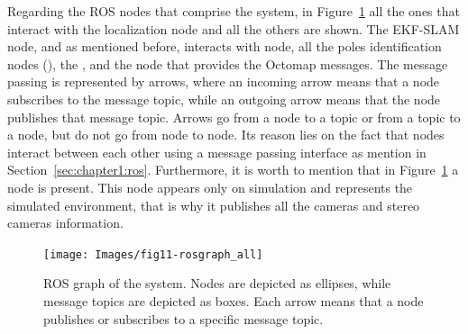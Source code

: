 Regarding the \ac{ROS} nodes that comprise the system, in Figure~\ref{fig:chapter2:architecture:nodes:all} all the ones that interact with the localization node and all the others are shown. The EKF-SLAM node, and as mentioned before, interacts with  node, all the poles identification nodes (), the , and the  node that provides the Octomap messages. The message passing is represented by arrows, where an incoming arrow means that a node subscribes to the message topic, while an outgoing arrow means that the node publishes that message topic. Arrows go from a node to a topic or from a topic to a node, but do not go from node to node. Its reason lies on the fact that nodes interact between each other using a message passing interface as mention in Section~\ref{sec:chapter1:ros}. Furthermore, it is worth to mention that in Figure~\ref{fig:chapter2:architecture:nodes:all} a  node is present. This node appears only on simulation and represents the simulated environment, that is why it publishes all the cameras and stereo cameras information.\\
\begin{figure}
    \centering
    \texttt{[image: Images/fig11-rosgraph\_all]}
    \caption[ROS graph of the system]{\ac{ROS} graph of the system. Nodes are depicted as ellipses, while message topics are depicted as boxes. Each arrow means that a node publishes or subscribes to a specific message topic.}
    \label{fig:chapter2:architecture:nodes:all}
\end{figure}




















